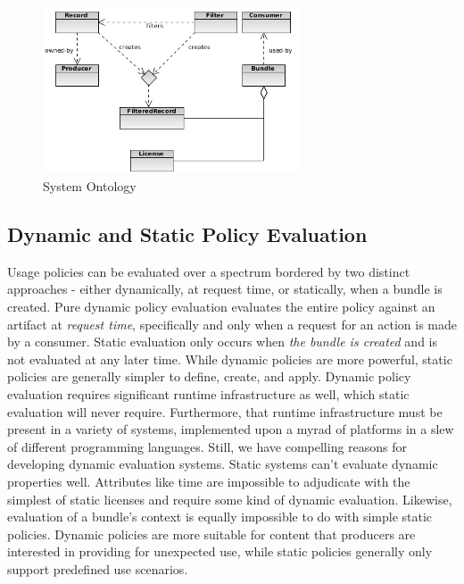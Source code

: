 \documentclass[10pt, conference, compsocconf]{IEEEtran}
\begin{document}
\begin{figure}[!t]
\centering
\includegraphics[width=3in]{ontology}
\caption{System Ontology}
\label{System Ontology}
\end{figure}

\subsection*{Dynamic and Static Policy Evaluation}
Usage policies can be evaluated over a spectrum bordered by two distinct approaches - either dynamically, at request time, or statically, when a bundle is created.  Pure dynamic policy evaluation evaluates the entire policy against an artifact at \textit{request time}, specifically and only when a request for an action is made by a consumer.  Static evaluation only occurs when \textit{the bundle is created} and is not evaluated at any later time.  While dynamic policies are more powerful, static policies are generally simpler to define, create, and apply.  Dynamic policy evaluation requires significant runtime infrastructure as well, which static evaluation will never require.  Furthermore, that runtime infrastructure must be present in a variety of systems, implemented upon a myrad of platforms in a slew of different programming languages.  Still, we have compelling reasons for developing dynamic evaluation systems.  Static systems can't evaluate dynamic properties well.  Attributes like time are impossible to adjudicate with the simplest of static licenses and require some kind of dynamic evaluation.  Likewise, evaluation of a bundle's context is equally impossible to do with simple static policies.  Dynamic policies are more suitable for content that producers are interested in providing for unexpected use, while static policies generally only support predefined use scenarios.
\end{document}
